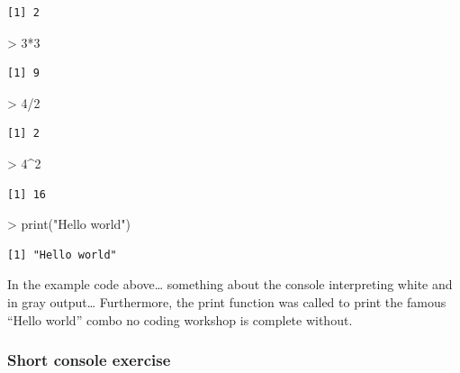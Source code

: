 \documentclass[
]{book}
\newenvironment{Shaded}{\begin{snugshade}}{\end{snugshade}}
\newcommand{\DecValTok}[1]{\textcolor[rgb]{0.00,0.00,0.81}{#1}}
\newcommand{\FunctionTok}[1]{\textcolor[rgb]{0.00,0.00,0.00}{#1}}
\newcommand{\NormalTok}[1]{#1}
\newcommand{\SpecialCharTok}[1]{\textcolor[rgb]{0.00,0.00,0.00}{#1}}
\newcommand{\StringTok}[1]{\textcolor[rgb]{0.31,0.60,0.02}{#1}}
\theoremstyle{definition}
\theoremstyle{definition}
\theoremstyle{definition}
\theoremstyle{definition}
\theoremstyle{remark}
\begin{document}
\begin{verbatim}
[1] 2
\end{verbatim}

\begin{Shaded}
\begin{Highlighting}[]
\SpecialCharTok{\textgreater{}} \DecValTok{3}\SpecialCharTok{*}\DecValTok{3}
\end{Highlighting}
\end{Shaded}

\begin{verbatim}
[1] 9
\end{verbatim}

\begin{Shaded}
\begin{Highlighting}[]
\SpecialCharTok{\textgreater{}} \DecValTok{4}\SpecialCharTok{/}\DecValTok{2}
\end{Highlighting}
\end{Shaded}

\begin{verbatim}
[1] 2
\end{verbatim}

\begin{Shaded}
\begin{Highlighting}[]
\SpecialCharTok{\textgreater{}} \DecValTok{4}\SpecialCharTok{\^{}}\DecValTok{2}
\end{Highlighting}
\end{Shaded}

\begin{verbatim}
[1] 16
\end{verbatim}

\begin{Shaded}
\begin{Highlighting}[]
\SpecialCharTok{\textgreater{}} \FunctionTok{print}\NormalTok{(}\StringTok{"Hello world"}\NormalTok{)}
\end{Highlighting}
\end{Shaded}

\begin{verbatim}
[1] "Hello world"
\end{verbatim}

In the example code above\ldots{} something about the console interpreting white and in gray output\ldots{} Furthermore, the print function was called to print the famous ``Hello world'' combo no coding workshop is complete without.

\hypertarget{short-console-exercise}{%
\subsubsection*{\texorpdfstring{\textbf{Short console exercise}}{Short console exercise}}\label{short-console-exercise}}
\end{document}
